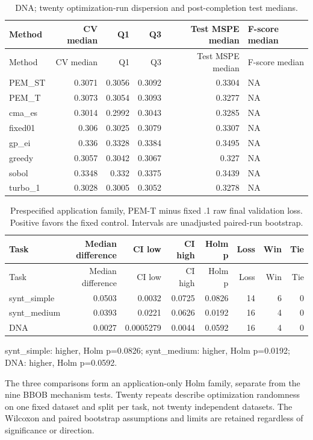 \documentclass[cmc,article,submit,moreauthors,pdftex]{Definitions/tsp}
\begin{document}
\begin{longtable}[]{@{}lrrrrl@{}}
\caption{DNA; twenty optimization-run dispersion and post-completion test medians.}\tabularnewline
\toprule
Method & CV median & Q1 & Q3 & Test MSPE median & F-score median \\
\midrule
\endfirsthead
\toprule
Method & CV median & Q1 & Q3 & Test MSPE median & F-score median \\
\midrule
\endhead
PEM\_ST & 0.3071 & 0.3056 & 0.3092 & 0.3304 & NA \\
PEM\_T & 0.3073 & 0.3054 & 0.3093 & 0.3277 & NA \\
cma\_es & 0.3014 & 0.2992 & 0.3043 & 0.3285 & NA \\
fixed01 & 0.306 & 0.3025 & 0.3079 & 0.3307 & NA \\
gp\_ei & 0.336 & 0.3328 & 0.3384 & 0.3495 & NA \\
greedy & 0.3057 & 0.3042 & 0.3067 & 0.327 & NA \\
sobol & 0.3348 & 0.332 & 0.3375 & 0.3439 & NA \\
turbo\_1 & 0.3028 & 0.3005 & 0.3052 & 0.3278 & NA \\
\bottomrule
\end{longtable}

\begin{longtable}[]{@{}lrrrrrrr@{}}
\caption{Prespecified application family, PEM-T minus fixed .1 raw final validation loss. Positive favors the fixed control. Intervals are unadjusted paired-run bootstrap.}\tabularnewline
\toprule
Task & Median difference & CI low & CI high & Holm p & Loss & Win & Tie \\
\midrule
\endfirsthead
\toprule
Task & Median difference & CI low & CI high & Holm p & Loss & Win & Tie \\
\midrule
\endhead
synt\_simple & 0.0503 & 0.0032 & 0.0725 & 0.0826 & 14 & 6 & 0 \\
synt\_medium & 0.0393 & 0.0221 & 0.0626 & 0.0192 & 16 & 4 & 0 \\
DNA & 0.0027 & 0.0005279 & 0.0044 & 0.0592 & 16 & 4 & 0 \\
\bottomrule
\end{longtable}

synt\_simple: higher, Holm p=0.0826; synt\_medium: higher, Holm p=0.0192; DNA: higher, Holm p=0.0592.

The three comparisons form an application-only Holm family, separate from the nine BBOB mechanism tests. Twenty repeats describe optimization randomness on one fixed dataset and split per task, not twenty independent datasets. The Wilcoxon and paired bootstrap assumptions and limits are retained regardless of significance or direction.
\end{document}
